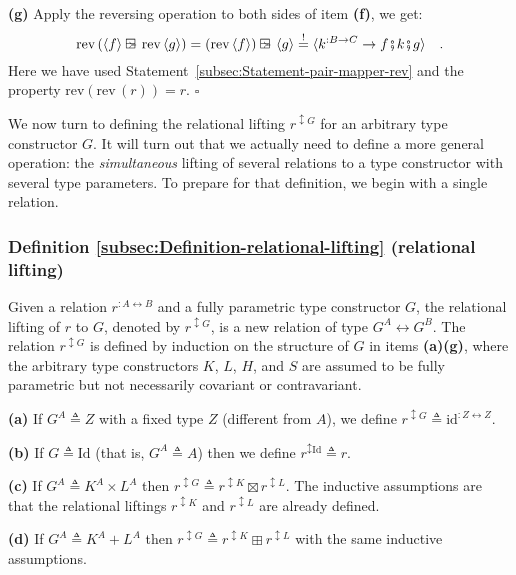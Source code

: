 \textbf{(g)} Apply the reversing operation to both sides of item \textbf{(f)},
we get:
\[
\text{rev}\,(\left<f\right>\ogreaterthan\text{rev}\left<g\right>)=(\text{rev}\left<f\right>)\ogreaterthan\left<g\right>\overset{!}{=}\langle k^{:B\rightarrow C}\rightarrow f\bef k\bef g\rangle\quad.
\]
Here we have used Statement~\ref{subsec:Statement-pair-mapper-rev}
and the property $\text{rev}\left(\text{rev}\,(r)\right)=r$. $\square$

We now turn to defining the relational lifting $r^{\updownarrow G}$
for an arbitrary type constructor $G$. It will turn out that we actually
need to define a more general operation: the \emph{simultaneous} lifting
of several relations to a type constructor with several type parameters.
To prepare for that definition, we begin with a single relation.

\subsubsection{Definition \label{subsec:Definition-relational-lifting}\ref{subsec:Definition-relational-lifting}
(relational lifting)}

Given a relation $r^{:A\leftrightarrow B}$ and a fully parametric
type constructor $G$, the relational lifting of $r$ to $G$, denoted
by $r^{\updownarrow G}$, is a new relation of type $G^{A}\leftrightarrow G^{B}$.
The relation $r^{\updownarrow G}$ is defined by induction on the
structure of $G$ in items \textbf{(a)}\textendash \textbf{(g)}, where
the arbitrary type constructors $K$, $L$, $H$, and $S$ are assumed
to be fully parametric but not necessarily covariant or contravariant. 

\textbf{(a)} If $G^{A}\triangleq Z$ with a fixed type $Z$ (different
from $A$), we define $r^{\updownarrow G}\triangleq\text{id}^{:Z\leftrightarrow Z}$.

\textbf{(b)} If $G\triangleq\text{Id}$ (that is, $G^{A}\triangleq A$)
then we define $r^{\updownarrow\text{Id}}\triangleq r$. 

\textbf{(c)} If $G^{A}\triangleq K^{A}\times L^{A}$ then $r^{\updownarrow G}\triangleq r^{\updownarrow K}\boxtimes r^{\updownarrow L}$.
The inductive assumptions are that the relational liftings $r^{\updownarrow K}$
and $r^{\updownarrow L}$ are already defined.

\textbf{(d)} If $G^{A}\triangleq K^{A}+L^{A}$ then $r^{\updownarrow G}\triangleq r^{\updownarrow K}\boxplus r^{\updownarrow L}$
with the same inductive assumptions.

